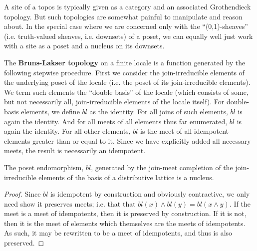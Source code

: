 \documentclass[a4paper,USenglish,cleveref, autoref, thm-restate,authorcolumns]{lipics-v2019}
\begin{document}
A site of a topos is typically given as a category and an associated Grothendieck topology. But such topologies are somewhat painful to manipulate and reason about. In the special case where we are concerned only with the ``(0,1)-sheaves'' (i.e. truth-valued sheaves, i.e. downsets) of a poset, we can equally well just work with a site as a poset and a nucleus on its downsets.

\begin{definition}
The \textbf{Bruns-Lakser topology} on a finite locale is a function generated by the following stepwise procedure. First we consider the join-irreducible elements of the underlying poset of the locale (i.e. the poset of its join-irreducible elements). We term such elements the ``double basis'' of the locale (which consists of some, but not necessarily all, join-irreducible elements of the locale itself). For double-basis elements, we define \(bl\) as the identity. For all joins of such elements, \(bl\) is again the identity. And for all meets of all elements thus far enumerated, \(bl\) is again the identity. For all other elements, \(bl\) is the meet of all idempotent elements greater than or equal to it. Since we have explicitly added all necessary meets, the result is necessarily an idempotent.
\end{definition}

\begin{lemma}
The poset endomorphism, \(bl\), generated by the join-meet completion of the join-irreducible elements of the basis of a distributive lattice is a nucleus.
\end{lemma}
\begin{proof}
Since \(bl\) is idempotent by construction and obviously contractive, we only need show it preserves meets; i.e. that that \(bl(x) \wedge bl(y) = bl(x  \wedge  y)\).  If the meet is a meet of idempotents, then it is preserved by construction. If it is not, then it is the meet of elements which themselves are the meets of idempotents. As such, it may be rewritten to be a meet of idempotents, and thus is also preserved.
\end{proof}

\end{document}
